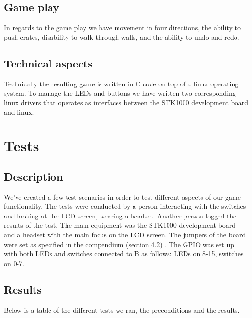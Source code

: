 \documentclass[a4paper,11pt]{article}
\begin{document}
\subsection{Game play}
In regards to the game play we have movement in four directions, the ability to push crates, disability to walk through walls, and the ability to undo and redo. 

\subsection{Technical aspects}Technically the resulting game is written in C code on top of a linux operating system. To manage the LEDs and buttons we have written two corresponding linux drivers that operates as interfaces between the STK1000 development board and linux. 


\section{Tests}
\subsection{Description}

We've created a few test scenarios in order to test different aspects of our game functionality. The tests were conducted by a person interacting with the switches and looking at the LCD screen, wearing a headset. Another person logged the results of the test. The main equipment was the STK1000 development board and a headset with the main focus on the LCD screen. The jumpers of the board were set as specified in the compendium (section 4.2) \cite{komp}. The GPIO was set up with both LEDs and switches connected to B as follows: LEDs on 8-15, switches on 0-7. 





\subsection{Results}
Below is a table of the different tests we ran, the preconditions and the results. 
\end{document}
